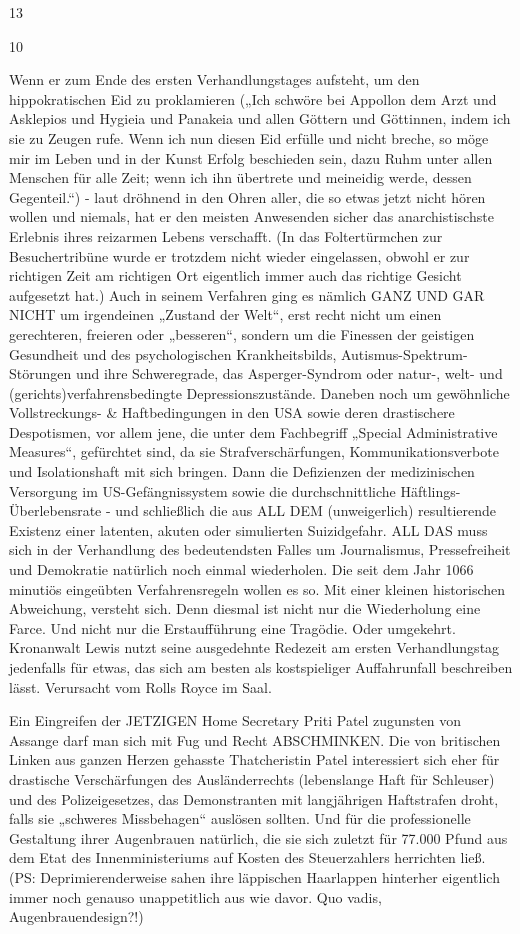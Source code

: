 \begin{multicols}{2}
13

10

Wenn er zum Ende des ersten Verhandlungstages aufsteht, um den hippokratischen Eid zu proklamieren
(„Ich schwöre bei Appollon dem Arzt und Asklepios und
Hygieia und Panakeia und allen Göttern und Göttinnen,
indem ich sie zu Zeugen rufe. Wenn ich nun diesen Eid
erfülle und nicht breche, so möge mir im Leben und in
der Kunst Erfolg beschieden sein, dazu Ruhm unter allen Menschen für alle Zeit; wenn ich ihn übertrete und
meineidig werde, dessen Gegenteil.“) - laut dröhnend
in den Ohren aller, die so etwas jetzt nicht hören wollen und niemals, hat er den meisten Anwesenden sicher
das anarchistischste Erlebnis ihres reizarmen Lebens
verschafft. (In das Foltertürmchen zur Besuchertribüne wurde er trotzdem nicht wieder eingelassen, obwohl
er zur richtigen Zeit am richtigen Ort eigentlich immer
auch das richtige Gesicht aufgesetzt hat.)
Auch in seinem Verfahren ging es nämlich GANZ UND
GAR NICHT um irgendeinen „Zustand der Welt“, erst
recht nicht um einen gerechteren, freieren oder „besseren“, sondern um die Finessen der geistigen Gesundheit und des psychologischen Krankheitsbilds, Autismus-Spektrum-Störungen und ihre Schweregrade, das
Asperger-Syndrom oder natur-, welt- und (gerichts)verfahrensbedingte Depressionszustände. Daneben noch
um gewöhnliche Vollstreckungs- \& Haftbedingungen
in den USA sowie deren drastischere Despotismen, vor
allem jene, die unter dem Fachbegriff „Special Administrative Measures“, gefürchtet sind, da sie Strafverschärfungen, Kommunikationsverbote und Isolationshaft mit
sich bringen. Dann die Defizienzen der medizinischen
Versorgung im US-Gefängnissystem sowie die durchschnittliche Häftlings-Überlebensrate - und schließlich
die aus ALL DEM (unweigerlich) resultierende Existenz
einer latenten, akuten oder simulierten Suizidgefahr.
ALL DAS muss sich in der Verhandlung des bedeutendsten Falles um Journalismus, Pressefreiheit und Demokratie natürlich noch einmal wiederholen. Die seit dem
Jahr 1066 minutiös eingeübten Verfahrensregeln wollen
es so. Mit einer kleinen historischen Abweichung, versteht sich. Denn diesmal ist nicht nur die Wiederholung
eine Farce. Und nicht nur die Erstaufführung eine Tragödie. Oder umgekehrt.
Kronanwalt Lewis nutzt seine ausgedehnte Redezeit am
ersten Verhandlungstag jedenfalls für etwas, das sich am
besten als kostspieliger Auffahrunfall beschreiben lässt.
Verursacht vom Rolls Royce im Saal.

Ein Eingreifen der JETZIGEN Home Secretary Priti Patel zugunsten von Assange darf man sich mit Fug und
Recht ABSCHMINKEN. Die von britischen Linken aus ganzen Herzen gehasste Thatcheristin Patel interessiert
sich eher für drastische Verschärfungen des Ausländerrechts (lebenslange Haft für Schleuser) und des Polizeigesetzes, das Demonstranten mit langjährigen Haftstrafen droht, falls sie „schweres Missbehagen“ auslösen
sollten. Und für die professionelle Gestaltung ihrer Augenbrauen natürlich, die sie sich zuletzt für 77.000 Pfund
aus dem Etat des Innenministeriums auf Kosten des Steuerzahlers herrichten ließ.
(PS: Deprimierenderweise sahen ihre läppischen Haarlappen hinterher eigentlich immer noch genauso unappetitlich aus wie davor. Quo vadis, Augenbrauendesign?!)


\end{multicols}
